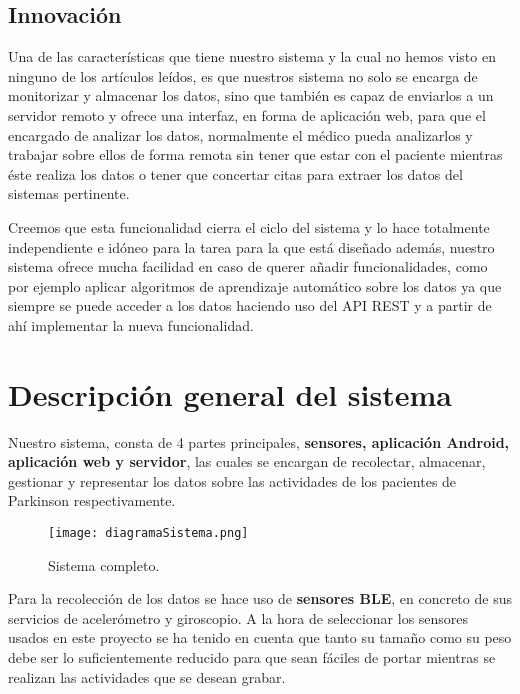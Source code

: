 \documentclass[11pt,spanish]{article}
\begin{document}
\subsection{Innovación}

Una de las características que tiene nuestro sistema y la cual no hemos visto en ninguno de los artículos leídos, es que nuestros sistema no solo se encarga de monitorizar y almacenar los datos, sino que también es capaz de enviarlos a un servidor remoto y ofrece una interfaz, en forma de aplicación web, para que el encargado de analizar los datos, normalmente el médico pueda analizarlos y trabajar sobre ellos de forma remota sin tener que estar con el paciente mientras éste realiza los datos o tener que concertar citas para extraer los datos del sistemas pertinente.
\newline

Creemos que esta funcionalidad cierra el ciclo del sistema y lo hace totalmente independiente e idóneo para la tarea para la que está diseñado además, nuestro sistema ofrece mucha facilidad en caso de querer añadir funcionalidades, como por ejemplo aplicar algoritmos de aprendizaje automático sobre los datos ya que siempre se puede acceder a los datos haciendo uso del API REST y a partir de ahí implementar la nueva funcionalidad.
\newpage

\section{Descripción general del sistema}
Nuestro sistema, consta de 4 partes principales, \textbf{sensores, aplicación Android, aplicación web y servidor}, las cuales se encargan de recolectar, almacenar, gestionar y representar los datos sobre las actividades de los pacientes de Parkinson respectivamente.
\newline 

\begin{figure}[H]
  \centering
  \texttt{[image: diagramaSistema.png]}
  \caption{Sistema completo.}
\end{figure}

Para la recolección de los datos se hace uso de \textbf{sensores BLE}, en concreto de sus servicios de acelerómetro y giroscopio. A la hora de seleccionar los sensores usados en este proyecto se ha tenido en cuenta que tanto su tamaño como su peso debe ser lo suficientemente reducido para que sean fáciles de portar mientras se realizan las actividades que se desean grabar.
\newline
\end{document}
